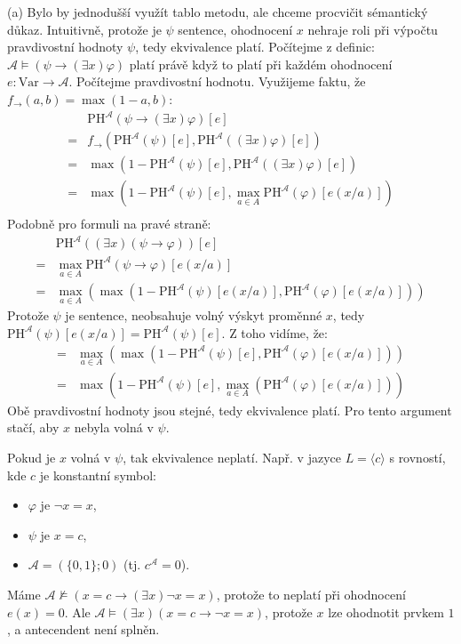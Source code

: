 \begin{problem}
\begin{solution}
        (a) Bylo by jednodušší využít tablo metodu, ale chceme procvičit sémantický důkaz. Intuitivně, protože je $\psi$ sentence, ohodnocení $x$ nehraje roli při výpočtu pravdivostní hodnoty $\psi$, tedy ekvivalence platí. Počítejme z definic: $\mathcal{A}\models (\psi \to (\exists x)\varphi)$ platí právě když to platí při každém ohodnocení $e:\mathrm{Var}\to\mathcal A$. Počítejme pravdivostní hodnotu. Využijeme faktu, že $f_\to(a,b)=\max(1-a,b)$:
            \begin{align*}
                &\mathrm{PH}^\mathcal A(\psi \to (\exists x)\varphi)[e]\\
                =&f_\to(\mathrm{PH}^\mathcal A(\psi)[e], \mathrm{PH}^\mathcal A((\exists x)\varphi)[e])\\
                =&\max(1-\mathrm{PH}^\mathcal A(\psi)[e], \mathrm{PH}^\mathcal A((\exists x)\varphi)[e])\\
                =&\max(1-\mathrm{PH}^\mathcal A(\psi)[e], \max_{a\in A}\mathrm{PH}^\mathcal A(\varphi)[e(x/a)])\\                
            \end{align*}
            Podobně pro formuli na pravé straně:
            \begin{align*}
                &\mathrm{PH}^\mathcal A((\exists x)(\psi \to \varphi))[e]\\
                =&\max_{a\in A}\mathrm{PH}^\mathcal A(\psi \to \varphi)[e(x/a)]\\
                =&\max_{a\in A}(\max(1-\mathrm{PH}^\mathcal A(\psi)[e(x/a)], \mathrm{PH}^\mathcal A(\varphi)[e(x/a)]))
            \end{align*}
            Protože $\psi$ je sentence, neobsahuje volný výskyt proměnné $x$, tedy $\mathrm{PH}^\mathcal A(\psi)[e(x/a)]=\mathrm{PH}^\mathcal A(\psi)[e]$. Z toho vidíme, že:
            \begin{align*}
                =&\max_{a\in A}(\max(1-\mathrm{PH}^\mathcal A(\psi)[e], \mathrm{PH}^\mathcal A(\varphi)[e(x/a)]))\\
                =&\max(1-\mathrm{PH}^\mathcal A(\psi)[e], \max_{a\in A}(\mathrm{PH}^\mathcal A(\varphi)[e(x/a)]))
            \end{align*}
            Obě pravdivostní hodnoty jsou stejné, tedy ekvivalence platí. Pro tento argument stačí, aby $x$ nebyla volná v $\psi$. 
            
            Pokud je $x$ volná v $\psi$, tak ekvivalence neplatí. Např. v jazyce $L=\langle c\rangle$ s rovností, kde $c$ je konstantní symbol:
            \begin{itemize}
                \item $\varphi$ je $\neg x=x$,
                \item $\psi$ je $x=c$,
                \item $\mathcal A=(\{0,1\};0)$ (tj. $c^\mathcal A=0$).
            \end{itemize}
            Máme $\mathcal A\not\models (x=c\to (\exists x) \neg x=x)$, protože to neplatí při ohodnocení $e(x)=0$. Ale $\mathcal A\models(\exists x)(x=c\to \neg x=x)$, protože $x$ lze ohodnotit prvkem $1$, a antecendent není splněn.


\end{solution}
\end{problem}
